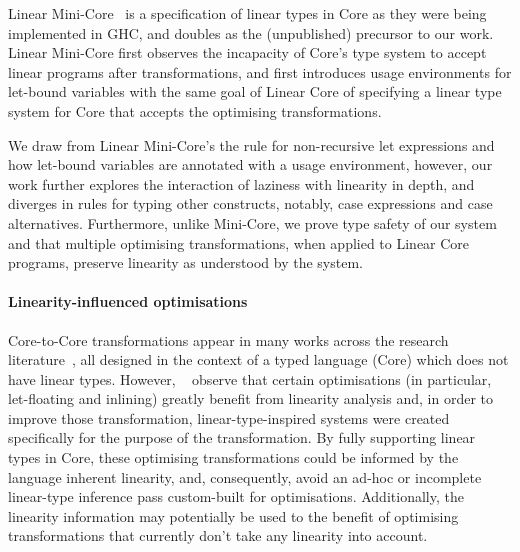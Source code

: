 \documentclass[acmsmall,review]{acmart}
\begin{document}
Linear Mini-Core~\cite{cite:minicore} is a specification of linear types in
Core as they were being implemented in GHC, and doubles as the (unpublished)
precursor to our work. Linear Mini-Core first observes the incapacity of
Core's type system to accept linear programs after transformations, and first
introduces usage environments for let-bound variables with the same goal of
Linear Core of specifying a linear type system for Core that accepts the
optimising transformations.

We draw from Linear Mini-Core's the rule for non-recursive let expressions and
how let-bound variables are annotated with a usage environment, however, our
work further explores the interaction of laziness with linearity in depth, and
diverges in rules for typing other constructs, notably, case expressions and
case alternatives. Furthermore, unlike Mini-Core, we prove type safety of our
system and that multiple optimising transformations, when applied to Linear
Core programs, preserve linearity as understood by the system.

% 
% 

% 

\paragraph{Linearity-influenced optimisations}

Core-to-Core transformations appear in many works across the research
literature~\cite{cite:let-floating,peytonjones1997a,santos1995compilation,peytonjones2002secrets,baker-finch2004constructed,maurer2017compiling,Breitner2016_1000054251,sergey_vytiniotis_jones_breitner_2017},
all designed in the context of a typed language (Core) which does not have
linear types. However,
~\cite{cite:let-floating,peytonjones1997a,cite:linearhaskell} observe that
certain optimisations (in particular, let-floating and inlining) greatly
benefit from linearity analysis and, in order to improve those transformation,
linear-type-inspired systems were created specifically for the purpose of the
transformation.
%
By fully supporting linear types in Core, these optimising transformations
could be informed by the language inherent linearity, and, consequently, avoid
an ad-hoc or incomplete linear-type inference pass custom-built for
optimisations. Additionally, the linearity information may potentially be used
to the benefit of optimising transformations that currently don't take any
linearity into account.
\end{document}
